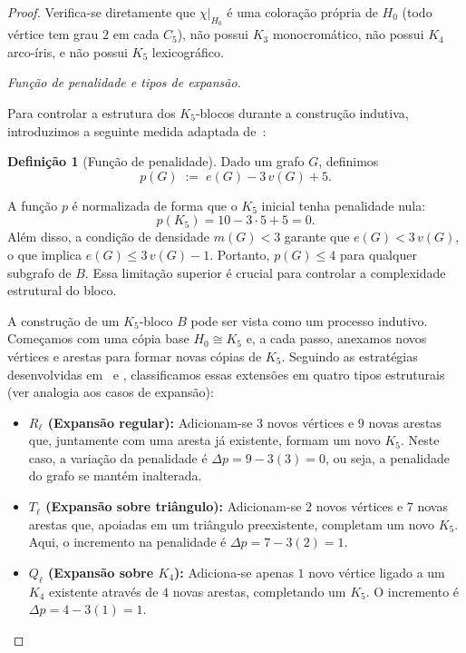 \documentclass[reqno, 12pt]{amsart}
\numberwithin{equation}{section}
\theoremstyle{plain}
\theoremstyle{definition}
\newtheorem{definition}[theorem]{Definição}
\newcommand{\maxdens}{m}
\begin{document}
\begin{proof}
\noindent
Verifica-se diretamente que $\chi|_{H_0}$ é uma coloração própria de $H_0$ (todo vértice tem grau $2$ em cada $C_5$),
não possui $K_3$ monocromático, não possui $K_4$ arco-íris, e não possui $K_5$ lexicográfico.


\medskip
\noindent\textit{Função de penalidade e tipos de expansão.}

Para controlar a estrutura dos $K_5$-blocos durante a construção indutiva,
introduzimos a seguinte medida adaptada de~\cite{AntiComplete}:

\begin{definition}[Função de penalidade]
Dado um grafo $G$, definimos
\[
  p(G) \;:=\; e(G) - 3\,v(G) + 5.
\]
\end{definition}

A função $p$ é normalizada de forma que o $K_5$ inicial tenha penalidade nula:
\[
  p(K_5) = 10 - 3 \cdot 5 + 5 = 0.
\]
Além disso, a condição de densidade $\maxdens(G) < 3$ garante que $e(G) < 3\,v(G)$, o que implica
$e(G) \le 3\,v(G) - 1$. Portanto, $p(G) \le 4$ para qualquer subgrafo de $B$. Essa limitação superior é crucial para controlar a 
complexidade estrutural do bloco.

A construção de um $K_5$-bloco $B$ pode ser vista como um processo indutivo. Começamos com uma 
cópia base $H_0 \cong K_5$ e, a cada passo, anexamos novos vértices e arestas para formar novas 
cópias de $K_5$. Seguindo as estratégias desenvolvidas em~\cite{nenadov2017algorithmic} e \cite{AntiComplete},
classificamos essas extensões em quatro tipos estruturais (ver analogia aos casos de expansão):

\begin{itemize}
  \item \textbf{$R_\ell$ (Expansão regular):} Adicionam-se $3$ novos vértices e $9$ novas arestas que, juntamente 
    com uma aresta já existente, formam um novo $K_5$. 
    Neste caso, a variação da penalidade é $\Delta p = 9 - 3(3) = 0$, ou seja, a penalidade do 
    grafo se mantém inalterada.

  \item \textbf{$T_\ell$ (Expansão sobre triângulo):} Adicionam-se $2$ novos vértices e $7$ novas arestas que, 
    apoiadas em um triângulo preexistente, completam um novo $K_5$. 
    Aqui, o incremento na penalidade é $\Delta p = 7 - 3(2) = 1$.

  \item \textbf{$Q_\ell$ (Expansão sobre $K_4$):} Adiciona-se apenas $1$ novo vértice ligado a um $K_4$ 
    existente através de $4$ novas arestas, completando um $K_5$. 
    O incremento é $\Delta p = 4 - 3(1) = 1$.


\end{itemize}
\end{proof}
\end{document}
